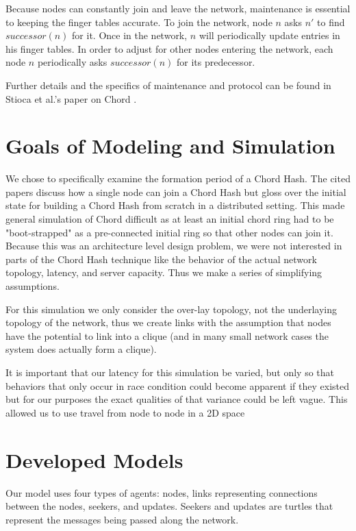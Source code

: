 \documentclass[12pt]{ieeetran} %
\begin{document}
Because nodes can constantly join and leave the network, maintenance is essential to keeping the finger tables accurate.  To join the network, node $n$ asks $n'$ to find $successor(n)$ for it.  Once in the network, $n$ will periodically update entries in his finger tables.  In order to adjust for other nodes entering the network, each node $n$ periodically asks $successor(n)$ for its predecessor. 

Further details and the specifics of maintenance and protocol can be found in Stioca et al.'s paper on Chord \cite{Chord}.



\section{Goals of Modeling and Simulation}
We chose to specifically examine the formation period of a Chord Hash. The cited papers discuss how a single node can join a Chord Hash but gloss over the initial state for building a Chord Hash from scratch in a distributed setting. This made general simulation of Chord difficult as at least an initial chord ring had to be "boot-strapped" as a pre-connected initial ring so that other nodes can join it. Because this was an architecture level design problem, we were not interested in parts of the Chord Hash technique like the behavior of the actual network topology, latency, and server capacity. Thus we make a series of simplifying assumptions.

For this simulation we only consider the over-lay topology, not the underlaying topology of the network, thus we create links with the assumption that nodes have the potential to link into a clique (and in many small network cases the system does actually form a clique).

It is important that our latency for this simulation be varied, but only so that behaviors that only occur in race condition could become apparent if they existed but for our purposes the exact qualities of that variance could be left vague. This allowed us to use travel from node to node in a 2D space


\section{Developed Models}

Our model uses four types of agents: nodes, links representing connections between the nodes, seekers, and updates.  Seekers and updates are turtles that represent the messages being passed along the network.
\end{document}

